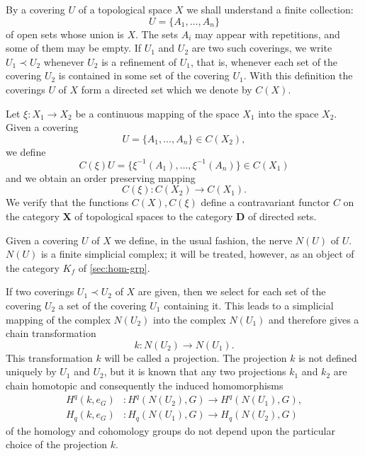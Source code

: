 \documentclass[11pt,a4paper]{report}
\begin{document}
By a covering $U$ of a topological space $X$ we shall understand a finite collection:
\begin{equation*}
	U = \{A_1,\dotsc,A_n\}
\end{equation*}
of open sets whose union is $X$. The sets $A_i$ may appear with repetitions, and some of
them may be empty. If $U_1$ and $U_2$ are two such coverings, we write $U_1\prec U_2$
whenever $U_2$ is a refinement of $U_1$, that is, whenever each set of the covering $U_2$
is contained in some set of the covering $U_1$. With this definition the coverings $U$ of
$X$ form a directed set which we denote by $C(X)$.

Let $\xi:X_1\rightarrow X_2$ be a continuous mapping of the space $X_1$ into the space
$X_2$. Given a covering
\begin{equation*}
	U= \{A_1,\dotsc,A_n\}\in C(X_2),
\end{equation*}
we define
\begin{equation*}
	C(\xi)U= \{\xi^{-1}(A_1),\dotsc,\xi^{-1}(A_n)\}\in C(X_1)
\end{equation*}
and we obtain an order preserving mapping
\begin{equation*}
	C(\xi): C(X_2)\rightarrow C(X_1).
\end{equation*}
We verify that the functions $C(X), C(\xi)$ define a contravariant functor $C$ on the category
$\mathbf{X}$ of topological spaces to the category $\mathbf{D}$ of directed sets.

Given a covering $U$ of $X$ we define, in the usual fashion, the nerve $N(U)$ of $U$. $N(U)$ is
a finite simplicial complex; it will be treated, however, as an object of the category $K_f$ of
\cref{sec:hom-grp}.

If two coverings $U_1\prec U_2$ of $X$ are given, then we select for each set of the covering
$U_2$ a set of the covering $U_1$ containing it. This leads to a simplicial mapping of the
complex $N(U_2)$ into the complex $N(U_1)$ and therefore gives a chain transformation
\begin{equation*}
	k:N(U_2)\rightarrow N(U_1).
\end{equation*}
This transformation $k$ will be called a projection. The projection $k$ is not defined uniquely
by $U_1$ and $U_2$, but it is known that any two projections $k_1$ and $k_2$ are chain homotopic
and consequently the induced homomorphisms
\begin{align}
	H^q(k,e_G) &: H^q(N(U_2),G)\rightarrow H^q(N(U_1),G),\label{eq:cech-hom}\\
	H_q(k,e_G) &: H_q(N(U_1),G)\rightarrow H_q(N(U_2),G)\label{eq:cech-cohom}
\end{align}
of the homology and cohomology groups do not depend upon the particular choice of the projection
$k$.
\end{document}
